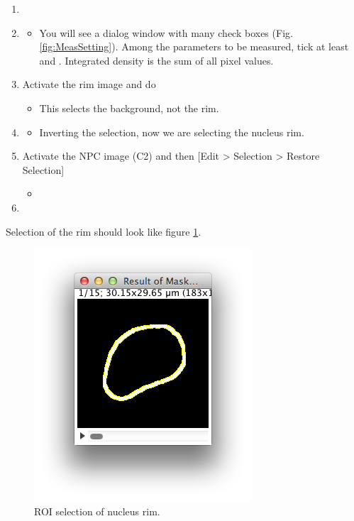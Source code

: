 \begin{enumerate}
  \item {}
  \item {}
  \begin{itemize}
    \item You will see a dialog window with many check boxes (Fig. \ref{fig:MeasSetting}). Among the parameters to be measured, tick at least  and . Integrated density is the sum of all pixel values. 
  \end{itemize}
  \item Activate the rim image and do 
  \begin{itemize}
    \item This selects the background, not the rim. 
  \end{itemize}
  \item {}
  \begin{itemize}
    \item Inverting the selection, now we are selecting the nucleus rim. 
  \end{itemize}
  \item Activate the NPC image (C2) and then [Edit > Selection > Restore Selection]
  \begin{itemize}
      \item 
  \end{itemize}
  \item {}
\end{enumerate}

Selection of the rim should look like figure \ref{fig_RoiNucRim}.

\begin{figure}[h!]
\begin{center}
\includegraphics[scale=0.8]{fig/ROIselectionNucRim.png}
\caption{ROI selection of nucleus rim. }
\label{fig_RoiNucRim}
\end{center}
\end{figure}

